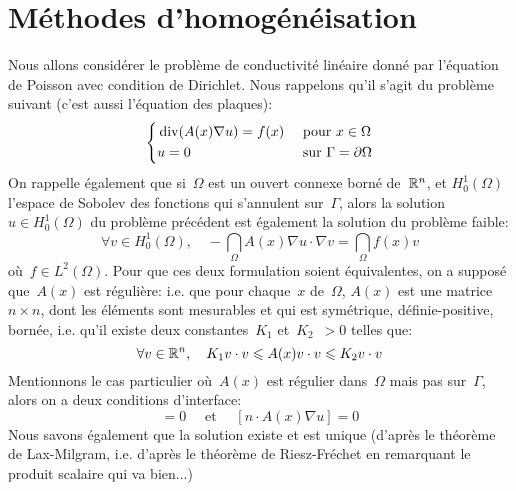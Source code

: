 \medskip
\section{Méthodes d'homogénéisation}

Nous allons considérer le problème de conductivité linéaire donné par l'équation de Poisson avec condition de Dirichlet. Nous rappelons qu'il s'agit du problème suivant (c'est aussi l'équation des plaques):
\begin{equation}
\left\{
\begin{aligned}
&\operatorname{div}(A(x)\nabla u) = f(x)&&\text{ pour } x\in\Omega\\
&u=0 &&\text{ sur } \Gamma=\partial\Omega
\end{aligned}
\right.
\end{equation}
On rappelle également que si~$\Omega$ est un ouvert connexe borné de~$\mathbb R^n$, et $H_0^1(\Omega)$ l'espace de Sobolev des fonctions qui s'annulent sur~$\Gamma$, alors la solution $u\in H_0^1(\Omega)$ du problème précédent est également la solution du problème faible:
\begin{equation}
\forall v\in H_0^1(\Omega),\quad -\dint_\Omega A(x)\nabla u\cdot\nabla v = \dint_\Omega f(x)v
\end{equation}
où~$f\in L^2(\Omega)$.
Pour que ces deux formulation soient équivalentes, on a supposé que~$A(x)$ est régulière: i.e. que pour chaque~$x$ de~$\Omega$, $A(x)$ est une matrice~$n\times n$, dont les éléments sont mesurables et qui est symétrique, définie-positive, bornée, i.e. qu'il existe deux constantes~$K_1$ et~$K_2$~$>0$ telles que:
\begin{equation}\forall v\in\mathbb R^n,\quad K_1 v\cdot v \leqslant A(x) v\cdot v \leqslant K_2 v\cdot v\end{equation}
Mentionnons le cas particulier où~$A(x)$ est régulier dans~$\Omega$ mais pas sur~$\Gamma$, alors on a deux conditions d'interface:
\begin{equation}
[u]=0 \quad\text{ et }\quad [n\cdot A(x)\nabla u]=0
\end{equation}
Nous savons également que la solution existe et est unique (d'après le théorème de Lax-Milgram, i.e. d'après le théorème de Riesz-Fréchet en remarquant le produit scalaire qui va bien...)

